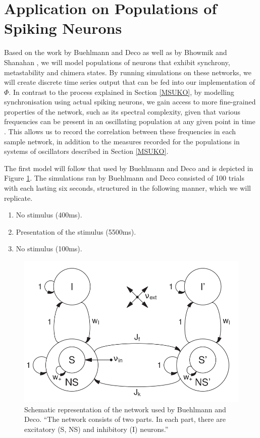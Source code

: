 \documentclass[a4paper,11pt]{article}
\begin{document}
\section{Application on Populations of Spiking Neurons}
\label{MSUSNN}

Based on the work by Buehlmann and Deco \cite{Buehlmann2010} as well as by Bhowmik and Shanahan \cite{Bhowmik2013}, we will model populations of neurons that exhibit synchrony, metastability and chimera states. By running simulations on these networks, we will create discrete time series output that can be fed into our implementation of $\Phi$. In contrast to the process explained in Section \ref{MSUKO}, by modelling synchronisation using actual spiking neurons, we gain access to more fine-grained properties of the network, such as its spectral complexity, given that various frequencies can be present in an oscillating population at any given point in time \cite{Bhowmik2013}. This allows us to record the correlation between these frequencies in each sample network, in addition to the measures recorded for the populations in systems of oscillators described in Section \ref{MSUKO}.

The first model will follow that used by Buehlmann and Deco and is depicted in Figure \ref{Buehlmann2010_Schema}. The simulations ran by Buehlmann and Deco consisted of 100 trials with each lasting six seconds, structured in the following manner, which we will replicate.
\begin{enumerate}
\item{No stimulus (400ms).}
\item{Presentation of the stimulus (5500ms).}
\item{No stimulus (100ms)}.
\end{enumerate}

\begin{figure}[H]
\centering
\includegraphics[scale = 0.75]{Buehlmann2010_Schema}
\caption{Schematic representation of the network used by Buehlmann and Deco. ``The network consists of two parts. In each part, there are excitatory (S, NS) and inhibitory (I) neurons.'' \cite{Buehlmann2010}}
\label{Buehlmann2010_Schema}
\end{figure}
\end{document}
